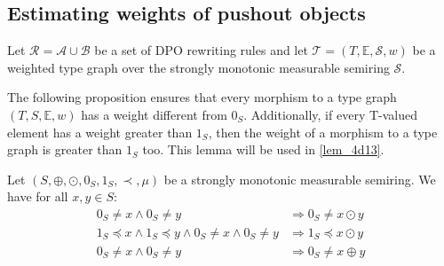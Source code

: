 \subsection{Estimating weights of pushout objects}
Let \( \mathcal{R} = \mathcal{A} \cup \mathcal{B} \) be a set of DPO rewriting rules and let \(\mathcal{T} = (T, \mathbb{E}, \mathcal{S}, w)\) be a weighted type graph over the strongly monotonic measurable semiring $\mathcal{S}$.

The following proposition ensures that every morphism to a type graph $(T,S,\mathbb{E}, w)$ has a weight different from $0_S$. Additionally, if every T-valued element has a weight greater than $1_S$, then the weight of a morphism to a type graph is greater than $1_S$ too. This lemma will be used in \autoref{lem_4d13}.
\begin{proposition}  
    \label{prop_endrullis_2d7}
    Let $(S, \oplus, \odot, 0_S, 1_S, \prec, \mu)$ be a strongly monotonic measurable semiring. We have for all $x,y\in S$:
    \begin{align*}
        0_S \neq x \land 0_S \neq y 
        &\Rightarrow 0_S \neq x \odot y 
        \tag{S10} \label{eq:prop_neq0_mul_neq0}  
        \\
        1_S \preceq x \land 1_S \preceq y \land 0_S \neq x \land 0_S \neq y  
        &\Rightarrow
         1_S \preceq x \odot y 
         \tag{S11} \label{eq:prop_neg0_ge1_mul_ge1}  
         \\
         0_S \neq x \land 0_S \neq y   
         &\Rightarrow 0_S \neq x \oplus y
         \tag{S12} \label{eq:prop_neq0_plus_neq0}  
    \end{align*}
\end{proposition}

